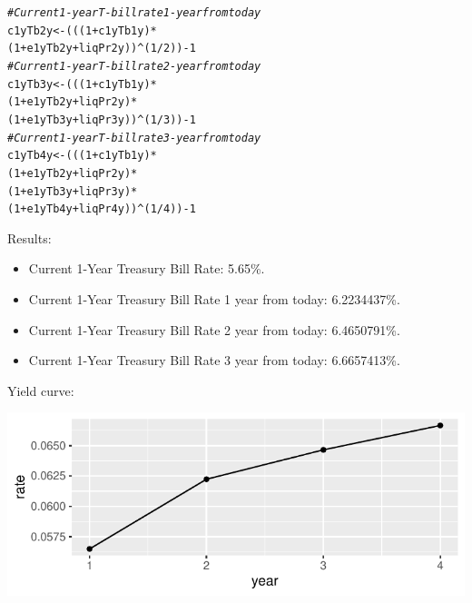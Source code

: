 \documentclass{article}\usepackage[]{graphicx}\usepackage[]{xcolor}
\makeatletter
\def\maxwidth{ %
  \ifdim\Gin@nat@width>\linewidth
    \linewidth
  \else
    \Gin@nat@width
  \fi
}
\newcommand{\hlnum}[1]{\textcolor[rgb]{0.686,0.059,0.569}{#1}}%
\newcommand{\hlcom}[1]{\textcolor[rgb]{0.678,0.584,0.686}{\textit{#1}}}%
\newcommand{\hlopt}[1]{\textcolor[rgb]{0,0,0}{#1}}%
\newcommand{\hlstd}[1]{\textcolor[rgb]{0.345,0.345,0.345}{#1}}%
\newcommand{\hlkwb}[1]{\textcolor[rgb]{0.69,0.353,0.396}{#1}}%
\newenvironment{kframe}{%
 \def\at@end@of@kframe{}%
 \ifinner\ifhmode%
  \def\at@end@of@kframe{\end{minipage}}%
  \begin{minipage}{\columnwidth}%
 \fi\fi%
 \def\FrameCommand##1{\hskip\@totalleftmargin \hskip-\fboxsep
 \colorbox{shadecolor}{##1}\hskip-\fboxsep
     \hskip-\linewidth \hskip-\@totalleftmargin \hskip\columnwidth}%
 \MakeFramed {\advance\hsize-\width
   \@totalleftmargin\z@ \linewidth\hsize
   \@setminipage}}%
 {\par\unskip\endMakeFramed%
 \at@end@of@kframe}
\newenvironment{knitrout}{}{} %
\makeatother
\begin{document}
\begin{knitrout}
\color{fgcolor}\begin{kframe}
\begin{alltt}
\hlcom{# Current 1-year T-bill rate 1-year from today}
\hlstd{c1yTb2y} \hlkwb{<-} \hlstd{( ( (} \hlnum{1} \hlopt{+} \hlstd{c1yTb1y )} \hlopt{*}
               \hlstd{(} \hlnum{1} \hlopt{+} \hlstd{e1yTb2y} \hlopt{+} \hlstd{liqPr2y ) )} \hlopt{^} \hlstd{(} \hlnum{1} \hlopt{/} \hlnum{2} \hlstd{) )} \hlopt{-} \hlnum{1}
\hlcom{# Current 1-year T-bill rate 2-year from today}
\hlstd{c1yTb3y} \hlkwb{<-} \hlstd{( ( (} \hlnum{1} \hlopt{+} \hlstd{c1yTb1y )} \hlopt{*}
               \hlstd{(} \hlnum{1} \hlopt{+} \hlstd{e1yTb2y} \hlopt{+} \hlstd{liqPr2y )} \hlopt{*}
               \hlstd{(} \hlnum{1} \hlopt{+} \hlstd{e1yTb3y} \hlopt{+} \hlstd{liqPr3y ) )} \hlopt{^} \hlstd{(} \hlnum{1} \hlopt{/} \hlnum{3} \hlstd{) )} \hlopt{-} \hlnum{1}
\hlcom{# Current 1-year T-bill rate 3-year from today}
\hlstd{c1yTb4y} \hlkwb{<-} \hlstd{( ( (} \hlnum{1} \hlopt{+} \hlstd{c1yTb1y )} \hlopt{*}
               \hlstd{(} \hlnum{1} \hlopt{+} \hlstd{e1yTb2y} \hlopt{+} \hlstd{liqPr2y )} \hlopt{*}
               \hlstd{(} \hlnum{1} \hlopt{+} \hlstd{e1yTb3y} \hlopt{+} \hlstd{liqPr3y )} \hlopt{*}
               \hlstd{(} \hlnum{1} \hlopt{+} \hlstd{e1yTb4y} \hlopt{+} \hlstd{liqPr4y ) )} \hlopt{^} \hlstd{(} \hlnum{1} \hlopt{/} \hlnum{4} \hlstd{) )} \hlopt{-} \hlnum{1}
\end{alltt}
\end{kframe}
\end{knitrout}
Results:\par
\begin{itemize}
  \item Current 1-Year Treasury Bill Rate: \num{5.65}\%.
  \item Current 1-Year Treasury Bill Rate 1 year from today: \num{6.2234437}\%.
  \item Current 1-Year Treasury Bill Rate 2 year from today: \num{6.4650791}\%.
  \item Current 1-Year Treasury Bill Rate 3 year from today: \num{6.6657413}\%.
\end{itemize}
Yield curve:\par
\begin{knitrout}
\color{fgcolor}

{\centering \includegraphics[width=\maxwidth]{figure/plot-1} 

}


\end{knitrout}
\end{document}
